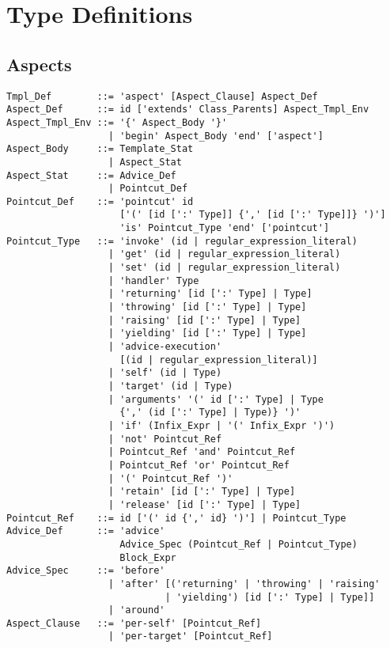
\chapter{Type Definitions}

\minitoc

\newpage

\section{Aspects}
\label{sec:aspects}

\syntax\begin{lstlisting}
Tmpl_Def        ::= 'aspect' [Aspect_Clause] Aspect_Def
Aspect_Def      ::= id ['extends' Class_Parents] Aspect_Tmpl_Env
Aspect_Tmpl_Env ::= '{' Aspect_Body '}'
                  | 'begin' Aspect_Body 'end' ['aspect']
Aspect_Body     ::= Template_Stat 
                  | Aspect_Stat
Aspect_Stat     ::= Advice_Def
                  | Pointcut_Def
Pointcut_Def    ::= 'pointcut' id
                    ['(' [id [':' Type]] {',' [id [':' Type]]} ')']
                    'is' Pointcut_Type 'end' ['pointcut']
Pointcut_Type   ::= 'invoke' (id | regular_expression_literal)
                  | 'get' (id | regular_expression_literal)
                  | 'set' (id | regular_expression_literal)
                  | 'handler' Type
                  | 'returning' [id [':' Type] | Type]
                  | 'throwing' [id [':' Type] | Type]
                  | 'raising' [id [':' Type] | Type]
                  | 'yielding' [id [':' Type] | Type]
                  | 'advice-execution' 
                    [(id | regular_expression_literal)]
                  | 'self' (id | Type)
                  | 'target' (id | Type)
                  | 'arguments' '(' id [':' Type] | Type 
                    {',' (id [':' Type] | Type)} ')'
                  | 'if' (Infix_Expr | '(' Infix_Expr ')')
                  | 'not' Pointcut_Ref
                  | Pointcut_Ref 'and' Pointcut_Ref
                  | Pointcut_Ref 'or' Pointcut_Ref
                  | '(' Pointcut_Ref ')'
                  | 'retain' [id [':' Type] | Type]
                  | 'release' [id [':' Type] | Type]
Pointcut_Ref    ::= id ['(' id {',' id} ')'] | Pointcut_Type
Advice_Def      ::= 'advice' 
                    Advice_Spec (Pointcut_Ref | Pointcut_Type)
                    Block_Expr
Advice_Spec     ::= 'before' 
                  | 'after' [('returning' | 'throwing' | 'raising'
                            | 'yielding') [id [':' Type] | Type]]
                  | 'around'
Aspect_Clause   ::= 'per-self' [Pointcut_Ref] 
                  | 'per-target' [Pointcut_Ref] 
\end{lstlisting}

